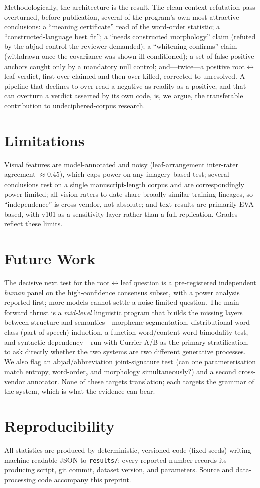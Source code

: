 \documentclass[11pt]{article}
\begin{document}
Methodologically, the architecture is the result. The clean-context refutation pass
overturned, before publication, several of the program's own most attractive
conclusions: a ``meaning certificate'' read of the word-order statistic; a
``constructed-language best fit''; a ``needs constructed morphology'' claim (refuted by
the abjad control the reviewer demanded); a ``whitening confirms'' claim (withdrawn
once the covariance was shown ill-conditioned); a set of false-positive anchors caught
only by a mandatory null control; and---twice---a positive root$\leftrightarrow$leaf
verdict, first over-claimed and then over-killed, corrected to unresolved. A pipeline
that declines to over-read a negative as readily as a positive, and that can overturn a
verdict asserted by its own code, is, we argue, the transferable contribution to
undeciphered-corpus research.

\section{Limitations}
Visual features are model-annotated and noisy (leaf-arrangement inter-rater agreement
$\approx 0.45$), which caps power on any imagery-based test; several conclusions rest
on a single manuscript-length corpus and are correspondingly power-limited; all
vision raters to date share broadly similar training lineages, so ``independence'' is
cross-vendor, not absolute; and text results are primarily EVA-based, with v101 as a
sensitivity layer rather than a full replication. Grades reflect these limits.

\section{Future Work}
The decisive next test for the root$\leftrightarrow$leaf question is a pre-registered
independent \emph{human} panel on the high-confidence consensus subset, with a power
analysis reported first; more models cannot settle a noise-limited question. The main
forward thrust is a \emph{mid-level} linguistic program that builds the missing layers
between structure and semantics---morpheme segmentation, distributional word-class
(part-of-speech) induction, a function-word/content-word bimodality test, and
syntactic dependency---run with Currier A/B as the primary stratification, to ask
directly whether the two systems are two different generative processes. We also flag
an abjad/abbreviation joint-signature test (can one parameterisation match entropy,
word-order, and morphology simultaneously?) and a second cross-vendor annotator. None
of these targets translation; each targets the grammar of the system, which is what
the evidence can bear.

\section*{Reproducibility}
All statistics are produced by deterministic, versioned code (fixed seeds) writing
machine-readable JSON to \texttt{results/}; every reported number records its
producing script, git commit, dataset version, and parameters. Source and
data-processing code accompany this preprint.



\end{document}
